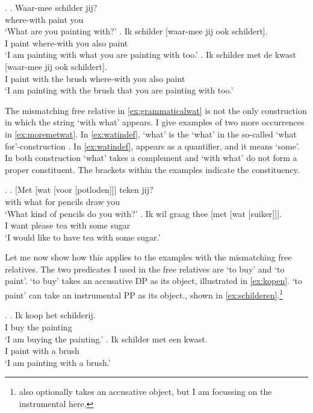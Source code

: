 \documentclass{article}
\begin{document}
\ex.\label{ex:constwaarmee}
\ag. Waar-mee schilder jij?\\
 {where-with} paint you\\
 `What are you painting with?'
\bg. Ik schilder [waar-mee jij ook schildert].\\
 I paint {where-with} you also paint\\
 `I am painting with what you are painting with too.'
\bg. Ik schilder met de kwast [waar-mee jij ook schildert].\\
 I paint with the brush {where-with} you also paint\\
 `I am painting with the brush that you are painting with too.'

The mismatching free relative in \ref{ex:grammaticalwat} is not the only construction in which the string  `with what' appears. I give examples of two more occurrences in \ref{ex:moremetwat}. In \ref{ex:watindef},  `what' is the  `what' in the so-called  `what for'-construction \citep[cf.][]{corver1991}.
In \ref{ex:watindef},  appears as a quantifier, and it means `some'. In both construction  `what' takes a complement and  `with what' do not form a proper constituent. The brackets within the examples indicate the constituency.

\ex.\label{ex:moremetwat}
\ag. [Met [wat [voor [potloden]]] teken jij?\\
 with what for pencils draw you\\
 `What kind of pencils do you with?'\label{ex:watwasfur}
\bg. Ik wil graag thee [met [wat [suiker]]].\\
 I want please tea with some sugar\\
 `I would like to have tea with some sugar.'\label{ex:watindef}

Let me now show how this applies to the examples with the mismatching free relatives. The two predicates I used in the free relatives are  `to buy' and   `to paint'.  `to buy' takes an accusative DP as its object, illustrated in \ref{ex:kopen}.  `to paint' can take an instrumental PP as its object., shown in \ref{ex:schilderen}.\footnote{ also optionally takes an accusative object, but I am focussing on the instrumental here.}

\ex.
\ag. Ik koop het schilderij.\\
 I buy the painting\\
 `I am buying the painting.'\label{ex:kopen}
\bg. Ik schilder met een kwast.\\
 I paint with a brush\\
 `I am painting with a brush.'\label{ex:schilderen}
\end{document}
